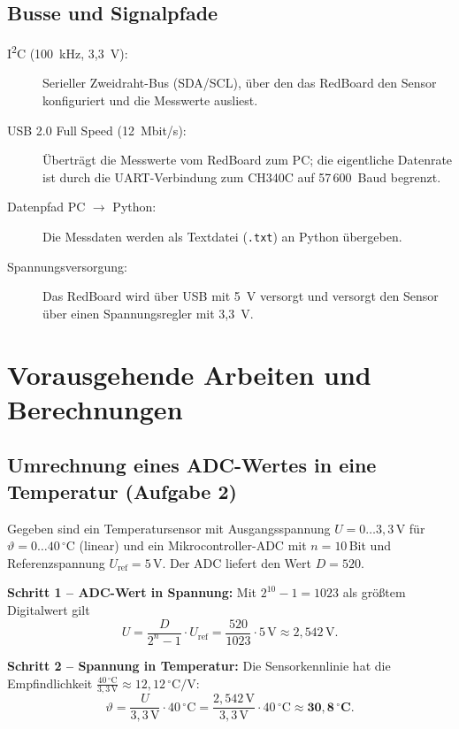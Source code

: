 \documentclass[a4paper,oneside,10pt]{article}
\begin{document}
\subsection*{Busse und Signalpfade}
\begin{description}
    \item[I\textsuperscript{2}C (100~kHz, 3{,}3~V):] Serieller Zweidraht-Bus (SDA/SCL), über
    den das RedBoard den Sensor konfiguriert und die Messwerte ausliest.
    \item[USB 2.0 Full Speed (12~Mbit/s):] Überträgt die Messwerte vom RedBoard zum PC;
    die eigentliche Datenrate ist durch die UART-Verbindung zum CH340C auf
    57\,600~Baud begrenzt.
    \item[Datenpfad PC $\rightarrow$ Python:] Die Messdaten werden als Textdatei
    (\texttt{.txt}) an Python übergeben.
    \item[Spannungsversorgung:] Das RedBoard wird über USB mit 5~V versorgt und
    versorgt den Sensor über einen Spannungsregler mit 3{,}3~V.
\end{description}

\section{Vorausgehende Arbeiten und Berechnungen}

\subsection{Umrechnung eines ADC-Wertes in eine Temperatur (Aufgabe 2)}

Gegeben sind ein Temperatursensor mit Ausgangsspannung $U = 0 \ldots 3{,}3$\,V
für $\vartheta = 0 \ldots 40\,^\circ$C (linear) und ein Mikrocontroller-ADC mit
$n = 10$\,Bit und Referenzspannung $U_\mathrm{ref} = 5$\,V. Der ADC liefert
den Wert $D = 520$.

\textbf{Schritt 1 -- ADC-Wert in Spannung:} Mit $2^{10}-1 = 1023$ als
größtem Digitalwert gilt
\begin{equation}
  U = \frac{D}{2^{n}-1}\cdot U_\mathrm{ref} = \frac{520}{1023}\cdot 5\,\mathrm{V} \approx 2{,}542\,\mathrm{V}.
\end{equation}

\textbf{Schritt 2 -- Spannung in Temperatur:} Die Sensorkennlinie hat die
Empfindlichkeit $\frac{40\,^\circ\mathrm{C}}{3{,}3\,\mathrm{V}} \approx 12{,}12\,^\circ\mathrm{C/V}$:
\begin{equation}
  \vartheta = \frac{U}{3{,}3\,\mathrm{V}}\cdot 40\,^\circ\mathrm{C}
            = \frac{2{,}542\,\mathrm{V}}{3{,}3\,\mathrm{V}}\cdot 40\,^\circ\mathrm{C}
            \approx \mathbf{30{,}8\,^\circ C}.
\end{equation}
\end{document}

